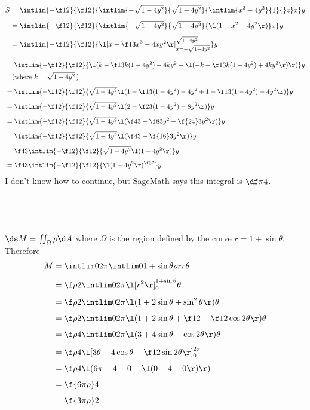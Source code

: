 \documentclass[a4paper]{article}
\begin{document}
\begin{align*}
S &= \intlim {-\f12}{\f12} {\intlim {-\sqrt{1 - 4y^2}}{\sqrt{1 - 4y^2}} {\intlim {x^2 + 4y^2}{1} {} z} x} y\\[1ex]
&= \intlim {-\f12}{\f12} {\intlim {-\sqrt{1 - 4y^2}}{\sqrt{1 - 4y^2}} {\l( 1 - x^2 - 4y^2 \r)} x} y\\[1ex]
&= \intlim {-\f12}{\f12} {\l[ x - \f13 x^3 - 4xy^2 \r]_{x = -\sqrt{1 - 4y^2}}^{\sqrt{1 - 4y^2}}} y\\[1ex]
\end{align*}
\begin{align*}
&= \intlim {-\f12}{\f12} {\l( k - \f13 k (1 - 4y^2) - 4k y^2 - \l( -k + \f13 k (1 - 4y^2) + 4k y^2 \r) \r)} y\\
&\quad \text{(where } k = \sqrt{1 - 4y^2}\, \text{)}\\[1ex]
&= \intlim {-\f12}{\f12} {\sqrt{1 - 4y^2} \l( 1 - \f13 (1 - 4y^2) - 4 y^2 + 1 - \f13 (1 - 4y^2) - 4 y^2 \r)} y\\[1ex]
&= \intlim {-\f12}{\f12} {\sqrt{1 - 4y^2} \l( 2 - \f23 (1 - 4y^2) - 8 y^2 \r)} y\\[1ex]
&= \intlim {-\f12}{\f12} {\sqrt{1 - 4y^2} \l( \f43 + \f83 y^2 - \f{24}3 y^2 \r)} y\\[1ex]
&= \intlim {-\f12}{\f12} {\sqrt{1 - 4y^2} \l( \f43 - \f{16}3 y^2 \r)} y\\[1ex]
&= \f43 \intlim {-\f12}{\f12} {\sqrt{1 - 4y^2} \l(1 - 4y^2 \r)} y\\[1ex]
&= \f43 \intlim {-\f12}{\f12} {\l(1 - 4y^2 \r)^{\f32}} y
\end{align*}
I don't know how to continue, but \href{https://www.sagemath.org/}{SageMath} says this integral is $\df\pi4$.


\subsection{~}

$\ds M = \iint_\Omega \rho \d A$ where $\Omega$ is the region defined by the curve $r = 1 + \sin \theta$. Therefore \begin{align*}
M &= \intlim 0{2\pi} {\intlim 0 {1 + \sin \theta} {\rho r} r} \theta\\[1ex]
&= \f\rho2 \intlim 0{2\pi} {\l[ r^2 \r]_0^{1 + \sin \theta}} \theta\\[1ex]
&= \f\rho2 \intlim 0{2\pi} {\l( 1 + 2\sin\theta + \sin^2 \theta \r)} \theta\\[1ex]
&= \f\rho2 \intlim 0{2\pi} {\l( 1 + 2\sin\theta + \f12 - \f12 \cos 2\theta \r)} \theta\\[1ex]
&= \f\rho4 \intlim 0{2\pi} {\l( 3 + 4\sin\theta - \cos 2\theta \r)} \theta\\[1ex]
&= \f\rho4 \l[ 3\theta - 4\cos\theta - \f12 \sin 2\theta \r]_0^{2\pi}\\[1ex]
&= \f\rho4 \l( 6\pi - 4 + 0 - \l( 0 - 4 - 0 \r) \r)\\[1ex]
&= \f{6\pi \rho}4\\[1ex]
&= \f{3\pi \rho}2\\[1ex]
\end{align*}
\end{document}
